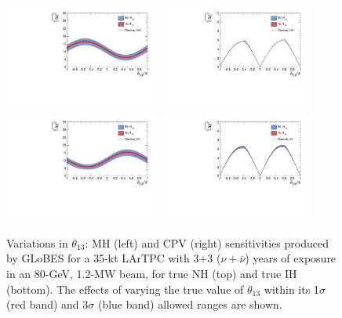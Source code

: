 \documentclass[letterpaper,11pt]{article}
\begin{document}
\begin{figure}[!htb]
  \centering
  \includegraphics[width=0.45\textwidth]{figs/mh_35kt_nh_th13.pdf}
  \includegraphics[width=0.45\textwidth]{figs/cpv_35kt_nh_th13.pdf}
  \includegraphics[width=0.45\textwidth]{figs/mh_35kt_ih_th13.pdf}
  \includegraphics[width=0.45\textwidth]{figs/cpv_35kt_ih_th13.pdf}
  \caption{
  Variations in $\theta_{13}$: 
  MH (left) and CPV (right) sensitivities 
  produced by GLoBES for a 35-kt LArTPC with 3+3 ($\nu + \overline{\nu}$) years of 
  exposure in an 80-GeV, 1.2-MW beam,  for true NH (top) and true IH (bottom). 
  The effects of varying the true
  value of $\theta_{13}$ within its 1$\sigma$ (red band) and 3$\sigma$ (blue band)
  allowed ranges are shown.} 
  \label{fig:th13sens}
\end{figure}
\end{document}
